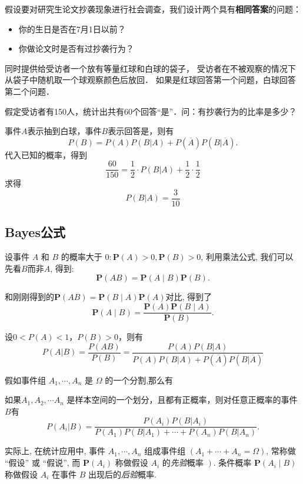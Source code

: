 \begin{example}
    假设要对研究生论文抄袭现象进行社会调查，我们设计两个具有\textbf{相同答案}的问题：
    \begin{itemize}
        \item 你的生日是否在7月1日以前？
        \item 你做论文时是否有过抄袭行为？
    \end{itemize}
    同时提供给受访者一个放有等量红球和白球的袋子，
    受访者在不被观察的情况下从袋子中随机取一个球观察颜色后放回．
    如果是红球回答第一个问题，白球回答第二个问题．

    假定受访者有150人，统计出共有60个回答“是”．问：有抄袭行为的比率是多少？
\end{example}

\begin{solution}
    事件$A$表示抽到白球，事件$B$表示回答是，则有
    $$P(B)=P(A)P(B|A)+P(\overline{A})P(B|\overline{A}).$$
    代入已知的概率，得到
    $$\frac{60}{150}=\frac12\cdot P(B|A)+\frac12\cdot\frac12 $$
    求得
    $$P(B|A)=\frac{3}{10}$$
\end{solution}

\subsection{Bayes公式}
设事件 $A$ 和 $B$ 的概率大于 $0: \mathbf{P}(A)>0, \mathbf{P}(B)>0$, 利用乘法公式, 我们可以先看$B$而非$A$, 得到: 
$$\mathbf{P}(A B)=\mathbf{P}(A \mid B) \mathbf{P}(B).$$

和刚刚得到的$\mathbf{P}(A B)=\mathbf{P}(B \mid A) \mathbf{P}(A)$对比, 得到了$$\mathbf{P}(A \mid B)=\frac{\mathbf{P}(A) \mathbf{P}(B \mid A)}{\mathbf{P}(B)}.$$

\begin{theorem}[Bayes定理]
    设$0<P(A)<1$，$P(B)>0$，则有
    $$P(A|B)=\frac{P(AB)}{P(B)}
        =\frac{P(A)P(B|A)}{P(A)P(B|A)+P(\overline{A})P(B|\overline{A})}$$
\end{theorem}

假如事件组 $A_1, \cdots, A_n$ 是 $\Omega$ 的一个分割,那么有

\begin{corollary}
    如果$A_1, A_2, \cdots A_n$ 是样本空间的一个划分，且都有正概率，则对任意正概率的事件$B$有
    \[
        P(A_i|B)=\frac{P(A_i)P(B|A_i)}{P(A_1)P(B|A_1)+\cdots+P(A_n)P(B|A_n)}.%
    \]
\end{corollary}

\begin{asidebox}
    实际上, 在统计应用中, 事件 $A_1, \cdots, A_n$ 组成事件组 $\left(A_1+\cdots+A_n=\Omega\right)$, 常称做 “假设” 或 “假说”, 而 $\mathbf{P}\left(A_i\right)$ 称做假设 $A_i$ 的\emph{先验}概率 $\left.\right)$. 条件概率 $\mathbf{P}\left(A_i \mid B\right)$ 称做假设 $A_i$ 在事件 $B$ 出现后的\emph{后验}概率. 
\end{asidebox}

